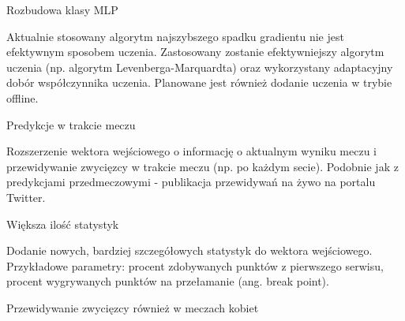\begin{tightitemize}
\item Rozbudowa klasy MLP

Aktualnie stosowany algorytm najszybszego spadku gradientu nie jest efektywnym sposobem uczenia. Zastosowany zostanie efektywniejszy algorytm uczenia (np. algorytm Levenberga-Marquardta) oraz wykorzystany adaptacyjny dobór współczynnika uczenia. Planowane jest również dodanie uczenia w trybie offline.

\item Predykcje w trakcie meczu

Rozszerzenie wektora wejściowego o informację o aktualnym wyniku meczu i przewidywanie zwycięzcy w trakcie meczu (np. po każdym secie). Podobnie jak z predykcjami przedmeczowymi - publikacja przewidywań na żywo na portalu Twitter.

\item Większa ilość statystyk

Dodanie nowych, bardziej szczegółowych statystyk do wektora wejściowego. Przykładowe parametry: procent zdobywanych punktów z pierwszego serwisu, procent wygrywanych punktów na przełamanie (ang. break point).

\item Przewidywanie zwycięzcy również w meczach kobiet

\end{tightitemize}




\listoffigures
\listoftables

